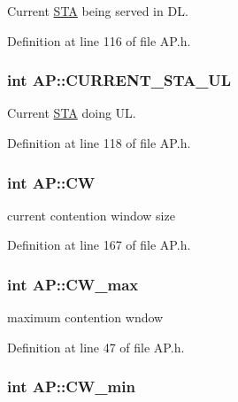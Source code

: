 Current \hyperlink{classSTA}{S\-T\-A} being served in D\-L. 



Definition at line 116 of file A\-P.\-h.

\hypertarget{classAP_a78174ebdb27995f7dce372fc78f3e486}{
\subsubsection[{C\-U\-R\-R\-E\-N\-T\-\_\-\-S\-T\-A\-\_\-\-U\-L}]{\setlength{\rightskip}{0pt plus 5cm}int A\-P\-::\-C\-U\-R\-R\-E\-N\-T\-\_\-\-S\-T\-A\-\_\-\-U\-L}}\label{classAP_a78174ebdb27995f7dce372fc78f3e486}


Current \hyperlink{classSTA}{S\-T\-A} doing U\-L. 



Definition at line 118 of file A\-P.\-h.

\hypertarget{classAP_a5f5fc6fd5279167b196a6387ff49825b}{
\subsubsection[{C\-W}]{\setlength{\rightskip}{0pt plus 5cm}int A\-P\-::\-C\-W}}\label{classAP_a5f5fc6fd5279167b196a6387ff49825b}


current contention window size 



Definition at line 167 of file A\-P.\-h.

\hypertarget{classAP_a3351a0a344c4a96a5a185aea2609fa7c}{
\subsubsection[{C\-W\-\_\-max}]{\setlength{\rightskip}{0pt plus 5cm}int A\-P\-::\-C\-W\-\_\-max\hspace{0.3cm}{\ttfamily [private]}}}\label{classAP_a3351a0a344c4a96a5a185aea2609fa7c}


maximum contention wndow 



Definition at line 47 of file A\-P.\-h.

\hypertarget{classAP_a02a0d02d7725c2b4ca51a3d6a88e677e}{
\subsubsection[{C\-W\-\_\-min}]{\setlength{\rightskip}{0pt plus 5cm}int A\-P\-::\-C\-W\-\_\-min\hspace{0.3cm}{\ttfamily [private]}}}\label{classAP_a02a0d02d7725c2b4ca51a3d6a88e677e}


